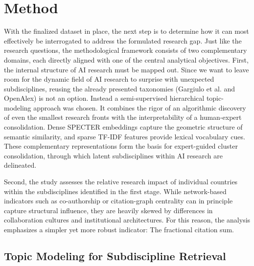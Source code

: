 \documentclass{article}
\begin{document}
	
	
	
	\section{Method}
	
	With the finalized dataset in place, the next step is to determine how it can most effectively be interrogated to address the formulated research gap. Just like the research questions, the methodological framework consists of two complementary domains, each directly aligned with one of the central analytical objectives. First, the internal structure of AI research must be mapped out. Since we want to leave room for the dynamic field of AI research to surprise with unexpected subdisciplines, reusing the already presented taxonomies (Gargiulo et al. and OpenAlex) is not an option. Instead a semi-supervised hierarchical topic-modeling approach was chosen. It combines the rigor of an algorithmic discovery of even the smallest research fronts with the interpretability of a human-expert consolidation. Dense SPECTER embeddings capture the geometric structure of semantic similarity, and sparse TF-IDF features provide lexical vocabulary cues. These complementary representations form the basis for expert-guided cluster consolidation, through which latent subdisciplines within AI research are delineated.
	
	Second, the study assesses the relative research impact of individual countries within the subdisciplines identified in the first stage. While network-based indicators such as co-authorship or citation-graph centrality can in principle capture structural influence, they are heavily skewed by differences in collaboration cultures and institutional architectures. For this reason, the analysis emphasizes a simpler yet more robust indicator: The fractional citation sum.
	
	
	\subsection{Topic Modeling for Subdiscipline Retrieval}
	
\end{document}
